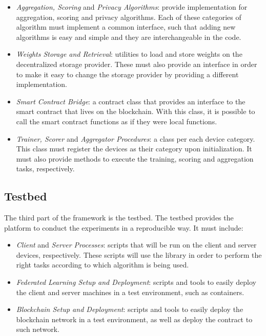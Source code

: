 \begin{itemize}
    \item \textit{Aggregation, Scoring} and \textit{Privacy Algorithms}: provide implementation for aggregation, scoring and privacy algorithms. Each of these categories of algorithm must implement a common interface, such that adding new algorithms is easy and simple and they are interchangeable in the code.
    
    \item \textit{Weights Storage and Retrieval}: utilities to load and store weights on the decentralized storage provider. These must also provide an interface in order to make it easy to change the storage provider by providing a different implementation.
    
    \item \textit{Smart Contract Bridge}: a contract class that provides an interface to the smart contract that lives on the blockchain. With this class, it is possible to call the smart contract functions as if they were local functions.
    
    \item \textit{Trainer, Scorer} and \textit{Aggregator Procedures}: a class per each device category. This class must register the devices as their category upon initialization. It must also provide methods to execute the training, scoring and aggregation tasks, respectively.
\end{itemize}

\subsection{Testbed}\label{meth:testbed}

The third part of the framework is the testbed. The testbed provides the platform to conduct the experiments in a reproducible way. It must include:

\begin{itemize}
    \item \textit{Client} and \textit{Server Processes}: scripts that will be run on the client and server devices, respectively. These scripts will use the library in order to perform the right tasks according to which algorithm is being used.
    
    \item \textit{Federated Learning Setup and Deployment}: scripts and tools to easily deploy the client and server machines in a test environment, such as containers.
    
    \item \textit{Blockchain Setup and Deployment}: scripts and tools to easily deploy the blockchain network in a test environment, as well as deploy the contract to such network.
\end{itemize}

